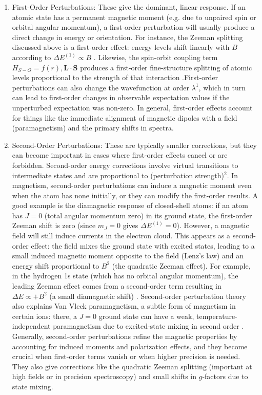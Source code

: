 \documentclass[12pt]{article}
\begin{document}
        \begin{enumerate}
            \item First-Order Perturbations: These give the dominant, linear response. If an atomic state has a permanent magnetic moment (e.g. due to unpaired spin or orbital angular momentum), a first-order perturbation will usually produce a direct change in energy or orientation. For instance, the Zeeman splitting discussed above is a first-order effect: energy levels shift linearly with $B$ according to $\Delta E^{(1)} \propto B$ \cite{Zeeman}. Likewise, the spin-orbit coupling term $H_{S-O} = f(r),\mathbf{L}\cdot\mathbf{S}$ produces a first-order fine-structure splitting of atomic levels proportional to the strength of that interaction \cite{PerturbationTheory}.First-order perturbations can also change the wavefunction at order $\lambda^1$, which in turn can lead to first-order changes in observable expectation values if the unperturbed expectation was non-zero. In general, first-order effects account for things like the immediate alignment of magnetic dipoles with a field (paramagnetism) and the primary shifts in spectra.
            
            \item Second-Order Perturbations: These are typically smaller corrections, but they can become important in cases where first-order effects cancel or are forbidden. Second-order energy corrections involve virtual transitions to intermediate states and are proportional to (perturbation strength)$^2$. In magnetism, second-order perturbations can induce a magnetic moment even when the atom has none initially, or they can modify the first-order results. A good example is the diamagnetic response of closed-shell atoms: if an atom has $J=0$ (total angular momentum zero) in its ground state, the first-order Zeeman shift is zero (since $m_J=0$ gives $\Delta E^{(1)}=0$). However, a magnetic field will still induce currents in the electron cloud. This appears as a second-order effect: the field mixes the ground state with excited states, leading to a small induced magnetic moment opposite to the field (Lenz’s law) and an energy shift proportional to $B^2$ (the quadratic Zeeman effect). For example, in the hydrogen 1s state (which has no orbital angular momentum), the leading Zeeman effect comes from a second-order term resulting in $\Delta E \propto +B^2$ (a small diamagnetic shift) \cite{QZeeman}. Second-order perturbation theory also explains Van Vleck paramagnetism, a subtle form of magnetism in certain ions: there, a $J=0$ ground state can have a weak, temperature-independent paramagnetism due to excited-state mixing in second order \cite{Magnetism}. Generally, second-order perturbations refine the magnetic properties by accounting for induced moments and polarization effects, and they become crucial when first-order terms vanish or when higher precision is needed. They also give corrections like the quadratic Zeeman splitting (important at high fields or in precision spectroscopy) and small shifts in $g$-factors due to state mixing.
        \end{enumerate}
 
\end{document}
